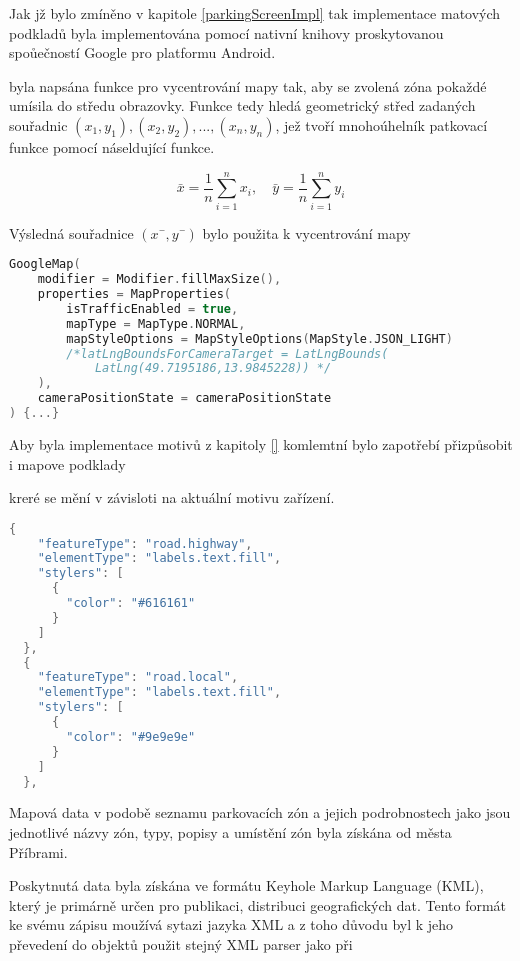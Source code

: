 Jak jž bylo zmíněno v kapitole \ref{parkingScreenImpl} tak implementace matových podkladů byla implementována pomocí nativní knihovy proskytovanou
spoůečností Google pro platformu Android. 

byla napsána funkce pro vycentrování mapy tak, aby se zvolená zóna pokaždé umísila do středu obrazovky. 
Funkce tedy hledá geometrický střed zadaných souřadnic \( (x_1, y_1), (x_2, y_2), ..., (x_n, y_n)\), jež tvoří mnohoúhelník patkovací funkce pomocí náseldující funkce.

\[
\bar{x} = \frac{1}{n} \sum_{i=1}^{n} x_i, \quad \bar{y} = \frac{1}{n} \sum_{i=1}^{n} y_i
\]

Výsledná souřadnice $(x¯,y¯)$ bylo použita k vycentrování mapy

\begin{lstlisting}[caption={GoogleMap element}, label={lst:GoogleMapview}, language=kotlin]
  GoogleMap(
    modifier = Modifier.fillMaxSize(),
    properties = MapProperties(
        isTrafficEnabled = true,
        mapType = MapType.NORMAL,
        mapStyleOptions = MapStyleOptions(MapStyle.JSON_LIGHT)
        /*latLngBoundsForCameraTarget = LatLngBounds(
            LatLng(49.7195186,13.9845228)) */
    ),
    cameraPositionState = cameraPositionState
) {...}
\end{lstlisting}


Aby byla implementace motivů z kapitoly \ref{} komlemtní bylo zapotřebí přizpůsobit i mapove podklady

kreré se mění v závisloti na aktuální motivu zařízení.

\begin{lstlisting}[caption={Motiv mapy ve formátu JSON}, label={lst:MapStyle}, language=kotlin]
  {
    "featureType": "road.highway",
    "elementType": "labels.text.fill",
    "stylers": [
      {
        "color": "#616161"
      }
    ]
  },
  {
    "featureType": "road.local",
    "elementType": "labels.text.fill",
    "stylers": [
      {
        "color": "#9e9e9e"
      }
    ]
  },
\end{lstlisting}


Mapová data v podobě seznamu parkovacích zón a jejich podrobnostech jako jsou jednotlivé názvy zón, typy, popisy a umístění zón byla získána od
města Příbrami. 

Poskytnutá data byla získána ve formátu Keyhole Markup Language (KML), který je primárně určen pro publikaci, distribuci geografických dat.
Tento formát ke svému zápisu moužívá sytazi jazyka XML a z toho důvodu byl k jeho převedení do objektů použit stejný XML parser jako při 

